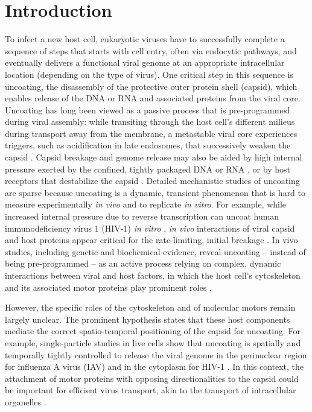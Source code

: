 \section{Introduction}

To infect a new host cell, eukaryotic viruses have to successfully complete a sequence of steps that starts with cell entry, often via endocytic pathways, and eventually delivers a functional viral genome at an appropriate intracellular location (depending on the type of virus). One critical step in this sequence is uncoating, the disassembly of the protective outer protein shell (capsid), which enables release of the DNA or RNA and associated proteins from the viral core. Uncoating has long been viewed as a passive process that is pre-programmed during viral assembly: while transiting through the host cell’s different milieus during transport away from the membrane, a metastable viral core experiences triggers, such as acidification in late endosomes, that successively weaken the capsid \cite{marsh2006virus}. Capsid breakage and genome release may also be aided by high internal pressure exerted by the confined, tightly packaged DNA or RNA \cite{brandariz2019pressure}, or by host receptors that destabilize the capsid \cite{zhao2019human}. Detailed mechanistic studies of uncoating are sparse because uncoating is a dynamic, transient phenomenon that is hard to measure experimentally \textit{in vivo} and to replicate \textit{in vitro}. For example, while increased internal pressure due to reverse transcription can uncoat human immunodeficiency virus 1 (HIV-1) \textit{in vitro} \cite{rankovic2017reverse}, \textit{in vivo} interactions of viral capsid and host proteins appear critical for the rate-limiting, initial breakage \cite{marquez2018kinetics, rawle2018toward}. In vivo studies, including genetic and biochemical evidence, reveal uncoating – instead of being pre-programmed – as an active process relying on complex, dynamic interactions between viral and host factors, in which the host cell’s cytoskeleton and its associated motor proteins play prominent roles \cite{greber2019adenovirus, helenius2018virus, james2018human, walsh2019exploitation}.

However, the specific roles of the cytoskeleton and of molecular motors remain largely unclear. The prominent hypothesis states that these host components mediate the correct spatio-temporal positioning of the capsid for uncoating. For example, single-particle studies in live cells show that uncoating is spatially and temporally tightly controlled to release the viral genome in the perinuclear region for influenza A virus (IAV) \cite{qin2019real} and in the cytoplasm for HIV-1 \cite{francis2016time}. In this context, the attachment of motor proteins with opposing directionalities to the capsid could be important for efficient virus transport, akin to the transport of intracellular organelles \cite{kural2005kinesin}.

